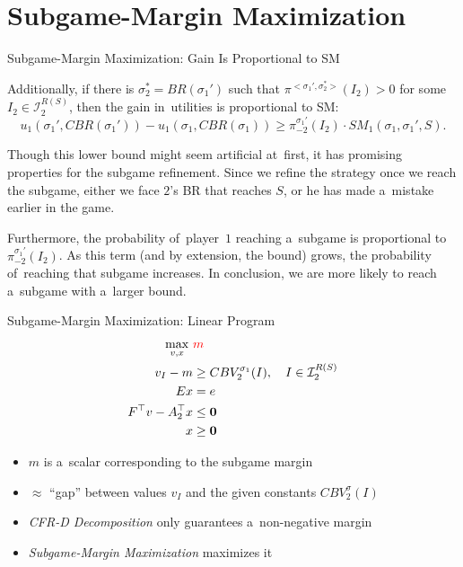 \documentclass{beamer}
\newcommand{\vect}[1]{\boldsymbol{#1}}
\newcommand{\I}{\mathcal{I}}
\begin{document}
  \section{Subgame-Margin Maximization}
  \begin{frame}{Subgame-Margin Maximization: Gain Is Proportional to SM}
    \pause
    \begin{theorem}
      Additionally, if there is $\sigma_2^* = BR(\sigma_1')$ such that $\pi^{<\sigma_1',\sigma_2^*>} (I_2) > 0$ for some $I_2 \in\I_2^{R(S)}$, then the gain in~utilities is proportional to SM:
      \[
        u_1(\sigma_1', CBR(\sigma_1')) - u_1(\sigma_1, CBR(\sigma_1)) \ge \pi_{-2}^{\sigma_1'} (I_2) \cdot SM_1(\sigma_1, \sigma_1', S).
      \]
    \end{theorem}

    Though this lower bound might seem artificial at~first, it has promising properties for the subgame refinement.
    Since we refine the strategy once we reach the subgame, either we face $2$'s BR that reaches $S$, or he has made a~mistake earlier in the game.

    Furthermore, the probability of~player~$1$ reaching a~subgame is proportional to $\pi_{-2}^{\sigma_1'}(I_2)$.
    As this term (and by extension, the bound) grows, the probability of~reaching that subgame increases.
    In conclusion, we are more likely to reach a~subgame with a~larger bound.
  \end{frame}

  \begin{frame}{Subgame-Margin Maximization: Linear Program}
    \begin{equation*}
      \label{lp:max-margin}
      \begin{split}
        \max_{v, x}\ &\textcolor{red}{m} \\
        v_I - m &\ge CBV_2^{\sigma_1}(I), \quad I \in \I_2^{R(S)}\\ 
        Ex &= e \\
        F^\top v - A_2^\top x &\le \vect{0} \\
        x &\ge \vect{0}
      \end{split}
    \end{equation*}
    \pause

    \begin{itemize}[<+- | alert@+>]
      \item $m$ is a~scalar corresponding to the subgame margin
      \item $\approx$ ``gap'' between values $v_I$ and the given constants $CBV_2^\sigma(I)$
      \item \emph{CFR-D Decomposition} only guarantees a~non-negative margin
      \item \emph{Subgame-Margin Maximization} maximizes it
    \end{itemize}
  \end{frame}
\end{document}
